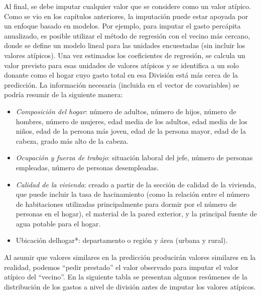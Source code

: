 \documentclass[
  10pt,
  spanish,
]{book}
\providecommand{\tightlist}{%
  \setlength{\itemsep}{0pt}\setlength{\parskip}{0pt}}
\begin{document}
Al final, se debe imputar cualquier valor que se considere como un valor atípico. Como se vio en los capítulos anteriores, la imputación puede estar apoyada por un enfoque basado en modelos. Por ejemplo, para imputar el gasto percápita anualizado, es posible utilizar el método de regresión con el vecino más cercano, donde se define un modelo lineal para las unidades encuestadas (sin incluir los valores atípicos). Una vez estimados los coeficientes de regresión, se calcula un valor previsto para esas unidades de valores atípicos y se identifica a un solo donante como el hogar cuyo gasto total en esa División está más cerca de la predicción. La información necesaria (incluida en el vector de covariables) se podría resumir de la siguiente manera:

\begin{itemize}
\tightlist
\item
  \emph{Composición del hogar}: número de adultos, número de hijos, número de hombres, número de mujeres, edad media de los adultos, edad media de los niños, edad de la persona más joven, edad de la persona mayor, edad de la cabeza, grado más alto de la cabeza.
\item
  \emph{Ocupación y fuerza de trabajo}: situación laboral del jefe, número de personas empleadas, número de personas desempleadas.
\item
  \emph{Calidad de la vivienda}: creado a partir de la sección de calidad de la vivienda, que puede incluir la tasa de hacinamiento (como la relación entre el número de habitaciones utilizadas principalmente para dormir por el número de personas en el hogar), el material de la pared exterior, y la principal fuente de agua potable para el hogar.
\item
  Ubicación delhogar*: departamento o región y área (urbana y rural).
\end{itemize}

Al asumir que valores similares en la predicción producirán valores similares en la realidad, podemos ``pedir prestado'' el valor observado para imputar el valor atípico del ``vecino''. En la siguiente tabla se presentan algunos resúmenes de la distribución de los gastos a nivel de división antes de imputar los valores atípicos.
\end{document}
